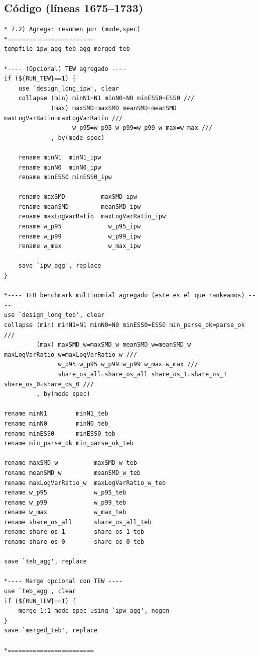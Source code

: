 \documentclass[12pt]{article}
\begin{document}
\subsection*{Código (líneas 1675--1733)}
\begin{lstlisting}
* 7.2) Agregar resumen por (mode,spec)
*========================
tempfile ipw_agg teb_agg merged_teb

*---- (Opcional) TEW agregado ----
if (${RUN_TEW}==1) {
    use `design_long_ipw', clear
    collapse (min) minN1=N1 minN0=N0 minESS0=ESS0 ///
             (max) maxSMD=maxSMD meanSMD=meanSMD maxLogVarRatio=maxLogVarRatio ///
                   w_p95=w_p95 w_p99=w_p99 w_max=w_max ///
             , by(mode spec)

    rename minN1  minN1_ipw
    rename minN0  minN0_ipw
    rename minESS0 minESS0_ipw

    rename maxSMD          maxSMD_ipw
    rename meanSMD         meanSMD_ipw
    rename maxLogVarRatio  maxLogVarRatio_ipw
    rename w_p95             w_p95_ipw
    rename w_p99             w_p99_ipw
    rename w_max             w_max_ipw

    save `ipw_agg', replace
}

*---- TEB benchmark multinomial agregado (este es el que rankeamos) ----
use `design_long_teb', clear
collapse (min) minN1=N1 minN0=N0 minESS0=ESS0 min_parse_ok=parse_ok ///
         (max) maxSMD_w=maxSMD_w meanSMD_w=meanSMD_w maxLogVarRatio_w=maxLogVarRatio_w ///
               w_p95=w_p95 w_p99=w_p99 w_max=w_max ///
               share_os_all=share_os_all share_os_1=share_os_1 share_os_0=share_os_0 ///
         , by(mode spec)

rename minN1        minN1_teb
rename minN0        minN0_teb
rename minESS0      minESS0_teb
rename min_parse_ok min_parse_ok_teb

rename maxSMD_w          maxSMD_w_teb
rename meanSMD_w         meanSMD_w_teb
rename maxLogVarRatio_w  maxLogVarRatio_w_teb
rename w_p95             w_p95_teb
rename w_p99             w_p99_teb
rename w_max             w_max_teb
rename share_os_all      share_os_all_teb
rename share_os_1        share_os_1_teb
rename share_os_0        share_os_0_teb

save `teb_agg', replace

*---- Merge opcional con TEW ----
use `teb_agg', clear
if (${RUN_TEW}==1) {
    merge 1:1 mode spec using `ipw_agg', nogen
}
save `merged_teb', replace

*========================
\end{lstlisting}
\end{document}
